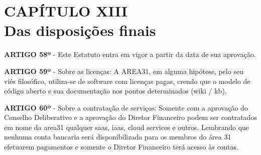 \chapter*{CAPÍTULO XIII \\ Das disposições finais}

\textbf{ARTIGO 58º} - Este Estatuto entra em vigor a partir da data de 
sua aprovação.

\bigskip

\textbf{ARTIGO 59º} - Sobre as licenças: 
A AREA31, em alguma hipótese, pelo seu viés filosófico, 
utiliza-se de software com licenças pagas, crendo que o modelo de 
código aberto e sua documentação nos pontos determinados (wiki / kb). 

\bigskip

\textbf{ARTIGO 60º} - Sobre a contratação de serviços: 
Somente com a aprovação do Conselho Deliberativo e a aprovação do Diretor 
Financeiro podem ser contratados em nome da area31 qualquer saas, iaas, 
cloud services e outros. Lembrando que nenhuma conta bancaria será 
disponibilizada para os membros do área 31 efetuarem pagamentos e somente 
o Diretor Financeiro terá acesso às contas. 
